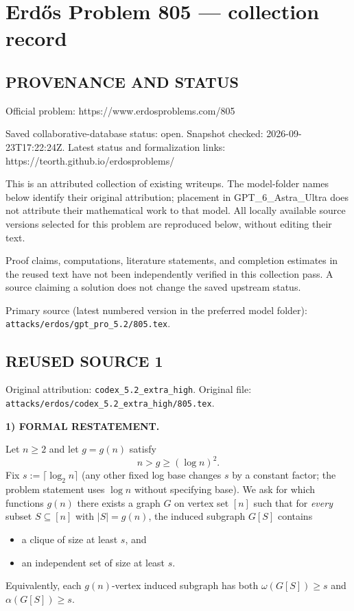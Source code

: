\section*{Erd\H{o}s Problem 805 --- collection record}

\subsection*{PROVENANCE AND STATUS}
Official problem: https://www.erdosproblems.com/805

Saved collaborative-database status: open.
Snapshot checked: 2026-09-23T17:22:24Z.
Latest status and formalization links: https://teorth.github.io/erdosproblems/

This is an attributed collection of existing writeups. The model-folder names below identify their original attribution; placement in GPT\_6\_Astra\_Ultra does not attribute their mathematical work to that model. All locally available source versions selected for this problem are reproduced below, without editing their text.

Proof claims, computations, literature statements, and completion estimates in the reused text have not been independently verified in this collection pass. A source claiming a solution does not change the saved upstream status.

Primary source (latest numbered version in the preferred model folder): \texttt{attacks/erdos/gpt\_pro\_5.2/805.tex}.

\subsection*{REUSED SOURCE 1}
Original attribution: \texttt{codex\_5.2\_extra\_high}.
Original file: \texttt{attacks/erdos/codex\_5.2\_extra\_high/805.tex}.

\noindent\textbf{1) FORMAL RESTATEMENT.}

Let $n\ge 2$ and let $g=g(n)$ satisfy
\[
 n>g\ge (\log n)^2.
\]
Fix $s:=\lceil \log_2 n\rceil$ (any other fixed log base changes $s$ by a constant factor; the problem statement uses $\log n$ without specifying base).
We ask for which functions $g(n)$ there exists a graph $G$ on vertex set $[n]$ such that for \emph{every} subset $S\subseteq [n]$ with $|S|=g(n)$, the induced subgraph $G[S]$ contains
\begin{itemize}
\item a clique of size at least $s$, and
\item an independent set of size at least $s$.
\end{itemize}
Equivalently, each $g(n)$-vertex induced subgraph has both $\omega(G[S])\ge s$ and $\alpha(G[S])\ge s$.


